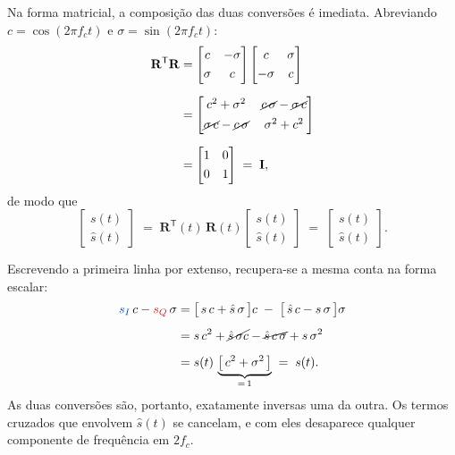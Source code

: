 \documentclass[11pt,a4paper]{article}
\begin{document}
Na forma matricial, a composição das duas conversões é imediata. Abreviando $c = \cos(2\pi f_c t)$ e $\sigma = \sin(2\pi f_c t)$:
\begin{align}
  \mathbf{R}^{\mathsf{T}}\mathbf{R}
  &= \begin{bmatrix} c & -\sigma \\[0.3em] \sigma & c \end{bmatrix}
     \begin{bmatrix} c & \sigma \\[0.3em] -\sigma & c \end{bmatrix}
  \label{eq:inv_passo1}\\[0.6em]
  &= \begin{bmatrix}
       c^{2} + \sigma^{2} & \cancel{c\,\sigma} - \cancel{\sigma\, c} \\[0.4em]
       \cancel{\sigma\, c} - \cancel{c\,\sigma} & \sigma^{2} + c^{2}
     \end{bmatrix}
  \label{eq:inv_passo2}\\[0.6em]
  &= \begin{bmatrix} 1 & 0 \\[0.3em] 0 & 1 \end{bmatrix} \;=\; \mathbf{I},
  \label{eq:inv_passo3}
\end{align}
de modo que
\begin{equation}
  \begin{bmatrix} s(t) \\[0.3em] \hat{s}(t) \end{bmatrix}
  \;=\; \mathbf{R}^{\mathsf{T}}(t)\,\mathbf{R}(t)
  \begin{bmatrix} s(t) \\[0.3em] \hat{s}(t) \end{bmatrix}
  \;=\; \begin{bmatrix} s(t) \\[0.3em] \hat{s}(t) \end{bmatrix}.
  \label{eq:inv_passo4}
\end{equation}

Escrevendo a primeira linha por extenso, recupera-se a mesma conta na forma escalar:
\begin{align}
  \textcolor{azul}{s_I}\,c - \textcolor{vermelho}{s_Q}\,\sigma
  &= \bigl[\,s\,c + \hat{s}\,\sigma\,\bigr] c \;-\; \bigl[\,\hat{s}\,c - s\,\sigma\,\bigr]\sigma
  \label{eq:inv_esc1}\\[0.5em]
  &= s\,c^{2} + \cancel{\hat{s}\,\sigma c} - \cancel{\hat{s}\,c\,\sigma} + s\,\sigma^{2}
  \label{eq:inv_esc2}\\[0.5em]
  &= s(t)\,\underbrace{\bigl[\,c^{2} + \sigma^{2}\,\bigr]}_{=\,1} \;=\; s(t).
  \label{eq:inv_esc3}
\end{align}
As duas conversões são, portanto, exatamente inversas uma da outra. Os termos cruzados que envolvem $\hat{s}(t)$ se cancelam, e com eles desaparece qualquer componente de frequência em $2f_c$.
\end{document}
